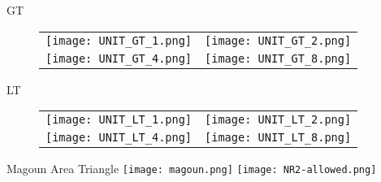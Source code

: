 \documentclass{beamer}
\begin{document}
\begin{frame}{GT}
    \begin{figure}[htb]
        \centering
        \begin{tabular}{cc}
            \texttt{[image: UNIT\_GT\_1.png]} &
            \texttt{[image: UNIT\_GT\_2.png]} \\
            \texttt{[image: UNIT\_GT\_4.png]} &
            \texttt{[image: UNIT\_GT\_8.png]}
        \end{tabular}
    \end{figure}
\end{frame}
\begin{frame}{LT}
    \begin{figure}[htb]
        \centering
        \begin{tabular}{cc}
            \texttt{[image: UNIT\_LT\_1.png]} &
            \texttt{[image: UNIT\_LT\_2.png]} \\
            \texttt{[image: UNIT\_LT\_4.png]} &
            \texttt{[image: UNIT\_LT\_8.png]}
        \end{tabular}
    \end{figure}
\end{frame}
\begin{frame}{Magoun Area Triangle}
    \centering
    \texttt{[image: magoun.png]}
    \hspace{0.5cm}
    \texttt{[image: NR2-allowed.png]}
\end{frame}
\end{document}

